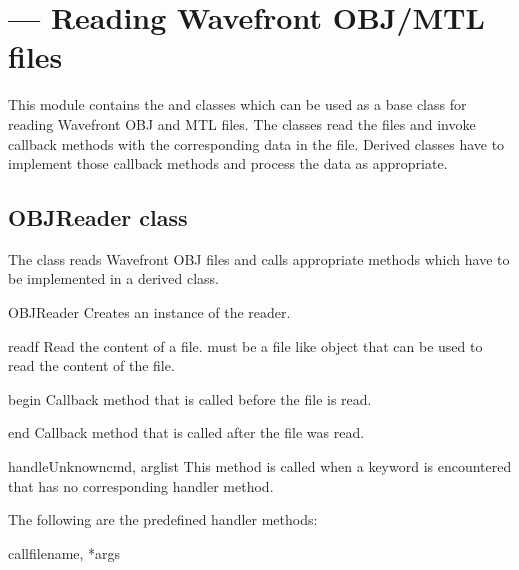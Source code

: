 \section{ ---
        Reading Wavefront OBJ/MTL files}


This module contains the  and  classes
which can be used as a base class for reading Wavefront OBJ and MTL files.
The classes read the files and invoke callback methods with the
corresponding data in the file. Derived classes have to implement
those callback methods and process the data as appropriate.

\subsection{OBJReader class}

The  class reads Wavefront OBJ files and calls
appropriate methods which have to be implemented in a derived class.

\begin{classdesc}{OBJReader}{}
  Creates an instance of the reader.
\end{classdesc}

\begin{methoddesc}{read}{f}
Read the content of a file.  must be a file like object that
can be used to read the content of the file.
\end{methoddesc}

\begin{methoddesc}{begin}{}
Callback method that is called before the file is read.
\end{methoddesc}

\begin{methoddesc}{end}{}
Callback method that is called after the file was read.
\end{methoddesc}

\begin{methoddesc}{handleUnknown}{cmd, arglist}
This method is called when a keyword is encountered that has no 
corresponding handler method.
\end{methoddesc}

The following are the predefined handler methods:

\begin{methoddesc}{call}{filename, *args}
\end{methoddesc}

